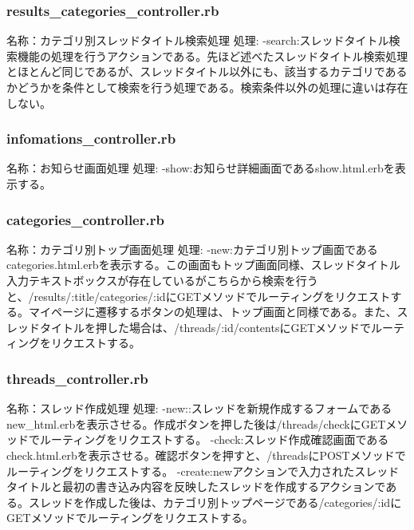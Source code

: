 \documentclass[a4j]{jarticle}
\begin{document}
\subsubsection{results\_categories\_controller.rb}
\noindent 名称：カテゴリ別スレッドタイトル検索処理 \newline
処理:\newline
-search:スレッドタイトル検索機能の処理を行うアクションである。先ほど述べたスレッドタイトル検索処理とほとんど同じであるが、スレッドタイトル以外にも、該当するカテゴリであるかどうかを条件として検索を行う処理である。検索条件以外の処理に違いは存在しない。\newline



\subsubsection{infomations\_controller.rb}
\noindent 名称：お知らせ画面処理 \newline
処理:\newline
-show:お知らせ詳細画面であるshow.html.erbを表示する。\newline



\subsubsection{categories\_controller.rb}
\noindent 名称：カテゴリ別トップ画面処理 \newline
処理:\newline
-new:カテゴリ別トップ画面であるcategories.html.erbを表示する。この画面もトップ画面同様、スレッドタイトル入力テキストボックスが存在しているがこちらから検索を行うと、/results/:title/categories/:idにGETメソッドでルーティングをリクエストする。マイページに遷移するボタンの処理は、トップ画面と同様である。また、スレッドタイトルを押した場合は、/threads/:id/contentsにGETメソッドでルーティングをリクエストする。\newline



\subsubsection{threads\_controller.rb}
\noindent 名称：スレッド作成処理 \newline
処理:\newline
-new::スレッドを新規作成するフォームであるnew\_html.erbを表示させる。作成ボタンを押した後は/threads/checkにGETメソッドでルーティングをリクエストする。\newline
-check:スレッド作成確認画面であるcheck.html.erbを表示させる。確認ボタンを押すと、/threadsにPOSTメソッドでルーティングをリクエストする。\newline
-create:newアクションで入力されたスレッドタイトルと最初の書き込み内容を反映したスレッドを作成するアクションである。スレッドを作成した後は、カテゴリ別トップページである/categories/:idにGETメソッドでルーティングをリクエストする。
\end{document}

